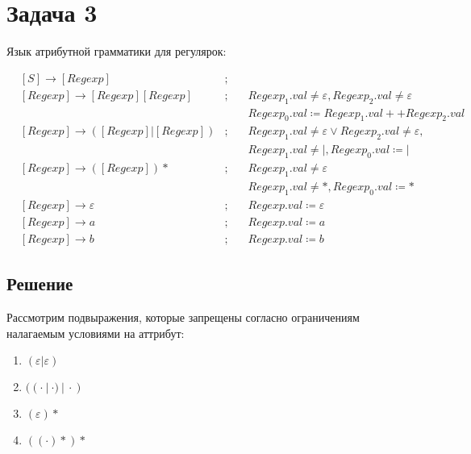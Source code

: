 \documentclass[a4paper, 14pt]{article}
\begin{document}
\newpage 

\section{Задача 3}

Язык атрибутной грамматики для регулярок:

$$
\begin{aligned}
  &[S] \rightarrow [Regexp] &;  \quad  \\
  &[Regexp] \rightarrow [Regexp][Regexp] &; \quad  &{Regexp_{1}.val \neq \varepsilon, Regexp_{2}.val \neq \varepsilon} \\
  & & \quad &{Regexp_{0}.val \coloneqq Regexp_{1}.val ++ Regexp_{2}.val}\\
  &[Regexp] \rightarrow ([Regexp]|[Regexp]) &; \quad &{Regexp_{1}.val \neq \varepsilon \lor Regexp_{2}.val \neq \varepsilon}, \\
  & & \quad &{Regexp_{1}.val \neq |}, Regexp_{0}.val \coloneqq | \\
  &[Regexp] \rightarrow ([Regexp])* &; \quad &{Regexp_{1}.val \neq \varepsilon}\\
  & & \quad &{Regexp_{1}.val \neq *}, Regexp_{0}.val \coloneqq * \\
  &[Regexp] \rightarrow \varepsilon &; \quad &{Regexp.val \coloneqq \varepsilon} \\
  &[Regexp] \rightarrow a &;  \quad &{Regexp.val \coloneqq a} \\
  &[Regexp] \rightarrow b &; \quad  &{Regexp.val \coloneqq b}
\end{aligned}
$$



\subsection{Решение}

Рассмотрим подвыражения, которые запрещены согласно ограничениям налагаемым условиями на аттрибут:

\begin{enumerate}
  \item{$(\varepsilon | \varepsilon)$}
  \item{$((\cdot \ | \ \cdot )\ | \ \cdot)$}
  \item{$(\varepsilon)*$}
  \item{$((\cdot)*)*$}
\end{enumerate}
\end{document}
